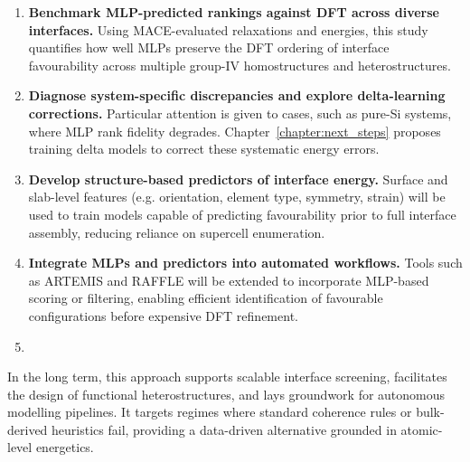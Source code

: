 \begin{enumerate}
    \item \textbf{Benchmark MLP-predicted rankings against DFT across diverse interfaces.} Using MACE-evaluated relaxations and energies, this study quantifies how well MLPs preserve the DFT ordering of interface favourability across multiple group-IV homostructures and heterostructures.
    \item \textbf{Diagnose system-specific discrepancies and explore delta-learning corrections.} Particular attention is given to cases, such as pure-Si systems, where MLP rank fidelity degrades. Chapter~\ref{chapter:next_steps} proposes training delta models to correct these systematic energy errors.
    \item \textbf{Develop structure-based predictors of interface energy.} Surface and slab-level features (e.g. orientation, element type, symmetry, strain) will be used to train models capable of predicting favourability prior to full interface assembly, reducing reliance on supercell enumeration.
    \item \textbf{Integrate MLPs and predictors into automated workflows.} Tools such as ARTEMIS and RAFFLE will be extended to incorporate MLP-based scoring or filtering, enabling efficient identification of favourable configurations before expensive DFT refinement.
\item \end{enumerate}

In the long term, this approach supports scalable interface screening, facilitates the design of functional heterostructures, and lays groundwork for autonomous modelling pipelines. It targets regimes where standard coherence rules or bulk-derived heuristics fail, providing a data-driven alternative grounded in atomic-level energetics.
